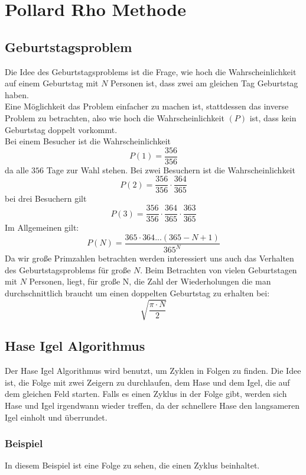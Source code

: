  
  
  \section{Pollard Rho Methode}
  \label{sec:pollard}
  \subsection{Geburtstagsproblem}
  Die Idee des Geburtstagsproblems ist die Frage, wie hoch die Wahrscheinlichkeit auf einem Geburtstag mit $N$ Personen ist, dass zwei am gleichen Tag Geburtstag haben.\\
  Eine M\"oglichkeit das Problem einfacher zu machen ist, stattdessen das inverse Problem zu betrachten, also wie hoch die Wahrscheinlichkeit $(P)$ ist, dass kein Geburtstag doppelt vorkommt.\\
  Bei einem Besucher ist die Wahrscheinlichkeit
  \[P(1)=\frac{356}{356}\] 
  da alle $356$ Tage zur Wahl stehen. Bei zwei Besuchern ist die Wahrscheinlichkeit 
  \[P(2)=\frac{356}{356}\cdot \frac{364}{365}\]
  bei drei Besuchern gilt  
  \[P(3)=\frac{356}{356}\cdot \frac{364}{365} \cdot \frac{363}{365}\]
  Im Allgemeinen gilt: 
  \[P(N)= \frac{365 \cdot 364 ... (365-N+1)}{365^N}\]
  Da wir gro\ss e Primzahlen betrachten werden interessiert uns auch das Verhalten des Geburtstagsproblems f\"ur gro\ss e $N$.
  Beim Betrachten von vielen Geburtstagen mit $N$ Personen, liegt, f\"ur gro\ss e N, die Zahl der Wiederholungen die man durchschnittlich braucht um einen doppelten Geburtstag zu erhalten bei: 
  \[\sqrt{\frac{\pi \cdot N}{2}}\]
  
  \subsection{Hase Igel Algorithmus}
  Der Hase Igel Algorithmus wird benutzt, um Zyklen in Folgen zu finden. Die Idee ist, die Folge mit zwei Zeigern zu durchlaufen, dem Hase und dem Igel, die auf dem gleichen Feld starten. Falls es einen Zyklus in der Folge gibt, werden sich Hase und Igel irgendwann wieder treffen, da der schnellere Hase den langsameren Igel einholt und \"uberrundet.
  \subsubsection{Beispiel}
  In diesem Beispiel ist eine Folge zu sehen, die einen Zyklus beinhaltet. 
  
